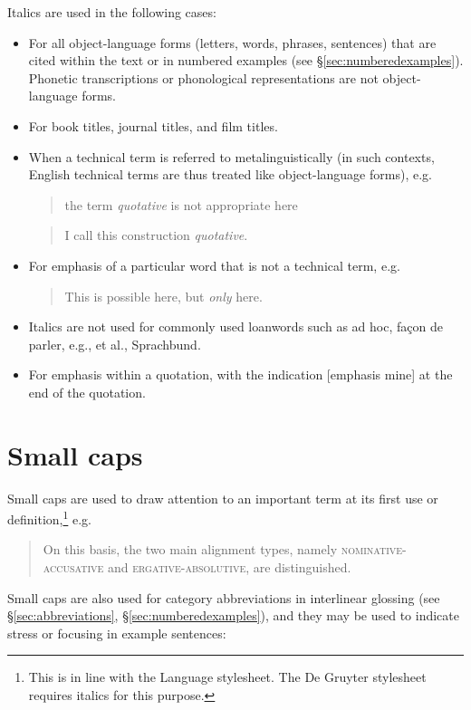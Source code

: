 \documentclass[a4paper]{article}
\newenvironment{gsrexq}{\begin{quote}\color{blue}}{\end{quote}}
\newcommand{\gsrex}[1]{{\color{blue}#1}}
\newcommand{\sectref}[1]{\S\ref{#1}}
\begin{document}
Italics are used in the following cases:
\begin{itemize}
\item For all object-language forms (letters, words, phrases, sentences) that are cited within the text or in numbered examples (see \sectref{sec:numberedexamples}). Phonetic transcriptions or phonological representations are not object-language forms.
\item For book titles, journal titles, and film titles.
\item When a technical term is referred to metalinguistically (in such contexts, English technical terms are thus treated like object-language forms), e.g.
  \begin{gsrexq}
    the term \textit{quotative} is not appropriate here
  \end{gsrexq} 
  \begin{gsrexq}
    I call this construction \textit{quotative}.
  \end{gsrexq}
\item For emphasis of a particular word that is not a technical term, e.g.
  \begin{gsrexq}
    This is possible here, but \textit{only} here.
  \end{gsrexq} 
\item Italics are not used for commonly used loanwords such as \gsrex{ad hoc}, \gsrex{façon de parler}, \gsrex{e.g.}, \gsrex{et al.}, \gsrex{Sprachbund}.
\item For emphasis within a quotation, with the indication [emphasis mine] at the end of the quotation.
\end{itemize}


\section{Small caps}\label{sec:small-caps}

Small caps are used to draw attention to an important term at its first
use or definition,\footnote{This is in line with the Language stylesheet.
The De Gruyter stylesheet requires italics for this purpose.} e.g.

\begin{gsrexq}
On this basis, the two main alignment types, namely 
\textsc{nominative-accusative}
and 
\textsc{ergative-absolutive}, 
are distinguished. 
\end{gsrexq}

Small caps are also used
for category abbreviations in interlinear glossing (see \sectref{sec:abbreviations}, \sectref{sec:numberedexamples}), and
they may be used to indicate stress or focusing in example sentences:
\end{document}

